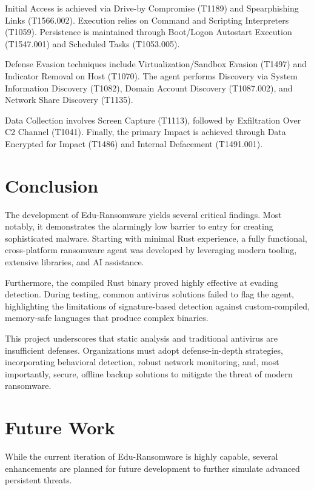 \documentclass[12pt,a4paper]{article}
\begin{document}
Initial Access is achieved via Drive-by Compromise (T1189) and Spearphishing Links (T1566.002). Execution relies on Command and Scripting Interpreters (T1059). Persistence is maintained through Boot/Logon Autostart Execution (T1547.001) and Scheduled Tasks (T1053.005).

Defense Evasion techniques include Virtualization/Sandbox Evasion (T1497) and Indicator Removal on Host (T1070). The agent performs Discovery via System Information Discovery (T1082), Domain Account Discovery (T1087.002), and Network Share Discovery (T1135).

Data Collection involves Screen Capture (T1113), followed by Exfiltration Over C2 Channel (T1041). Finally, the primary Impact is achieved through Data Encrypted for Impact (T1486) and Internal Defacement (T1491.001).

\section{Conclusion}

The development of Edu-Ransomware yields several critical findings. Most notably, it demonstrates the alarmingly low barrier to entry for creating sophisticated malware. Starting with minimal Rust experience, a fully functional, cross-platform ransomware agent was developed by leveraging modern tooling, extensive libraries, and AI assistance.

Furthermore, the compiled Rust binary proved highly effective at evading detection. During testing, common antivirus solutions failed to flag the agent, highlighting the limitations of signature-based detection against custom-compiled, memory-safe languages that produce complex binaries.

This project underscores that static analysis and traditional antivirus are insufficient defenses. Organizations must adopt defense-in-depth strategies, incorporating behavioral detection, robust network monitoring, and, most importantly, secure, offline backup solutions to mitigate the threat of modern ransomware.

\section{Future Work}

While the current iteration of Edu-Ransomware is highly capable, several enhancements are planned for future development to further simulate advanced persistent threats.
\end{document}

